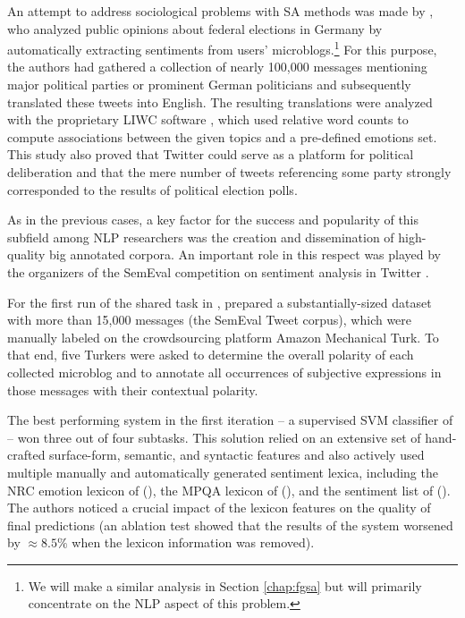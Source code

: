 An attempt to address sociological problems with SA methods was made
by \citet{Tumasjan:10}, who analyzed public opinions about federal
elections in Germany by automatically extracting sentiments from
users' microblogs.\footnote{We will make a similar analysis in Section
  \ref{chap:fgsa} but will primarily concentrate on the NLP aspect of
  this problem.}  For this purpose, the authors had gathered a
collection of nearly 100,000 messages mentioning major political
parties or prominent German politicians and subsequently translated
these tweets into English.  The resulting translations were analyzed
with the proprietary LIWC software \cite{Pannebaker:07}, which used
relative word counts to compute associations between the given topics
and a pre-defined emotions set.  This study also proved that Twitter
could serve as a platform for political deliberation and that the mere
number of tweets referencing some party strongly corresponded to the
results of political election polls.

As in the previous cases, a key factor for the success and popularity
of this subfield among NLP researchers was the creation and
dissemination of high-quality big annotated corpora.  An important
role in this respect was played by the organizers of the SemEval
competition on sentiment analysis in Twitter
\cite{Nakov:13,Rosenthal:14,Rosenthal:15}.

For the first run of the shared task in \citeyear{Nakov:13},
\citet{Nakov:13} prepared a substantially-sized dataset with more than
15,000 messages (the SemEval Tweet corpus), which were manually
labeled on the crowdsourcing platform Amazon Mechanical Turk.  To that
end, five Turkers were asked to determine the overall polarity of each
collected microblog and to annotate all occurrences of subjective
expressions in those messages with their contextual polarity.

The best performing system in the first iteration -- a supervised SVM
classifier of \citet{Mohammad:13} -- won three out of four subtasks.
This solution relied on an extensive set of hand-crafted surface-form,
semantic, and syntactic features and also actively used multiple
manually and automatically generated sentiment lexica, including the
NRC emotion lexicon of \citeauthor{Mohammad:13a}
(\citeyear{Mohammad:13a}), the MPQA lexicon of \citeauthor{Wilson:05}
(\citeyear{Wilson:05}), and the sentiment list of \citeauthor{Hu:04}
(\citeyear{Hu:04}).  The authors noticed a crucial impact of the
lexicon features on the quality of final predictions (an ablation test
showed that the results of the system worsened by $\approx8.5\%$ when
the lexicon information was removed).

